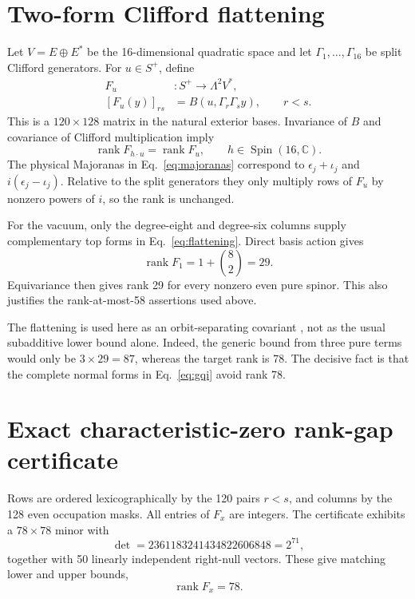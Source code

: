 \documentclass[aps,pra,reprint,groupedaddress,nofootinbib,longbibliography]{revtex4-2}
\newcommand{\C}{\mathbb{C}}
\newcommand{\rank}{\operatorname{rank}}
\begin{document}
\section{Two-form Clifford flattening}
\label{sec:flattening}

Let $V=E\oplus E^*$ be the 16-dimensional quadratic space and let
$\Gamma_1,\ldots,\Gamma_{16}$ be split Clifford generators.  For $u\in S^+$,
define
\begin{align}
 F_u &:S^+\longrightarrow\Lambda^2V^*,\\
 [F_u(y)]_{rs}&=B(u,\Gamma_r\Gamma_s y),\qquad r<s.
 \label{eq:flattening}
\end{align}
This is a $120\times128$ matrix in the natural exterior bases.  Invariance of
$B$ and covariance of Clifford multiplication imply
\begin{equation}
 \rank F_{h\cdot u}=\rank F_u,
 \qquad h\in\operatorname{Spin}(16,\C).
 \label{eq:equivariance}
\end{equation}
The physical Majoranas in Eq.~\eqref{eq:majoranas} correspond to
$\epsilon_j+\iota_j$ and $i(\epsilon_j-\iota_j)$.  Relative to the split
generators they only multiply rows of $F_u$ by nonzero powers of $i$, so the
rank is unchanged.

For the vacuum, only the degree-eight and degree-six columns supply complementary
top forms in Eq.~\eqref{eq:flattening}.  Direct basis action gives
\begin{equation}
 \rank F_1=1+\binom82=29.
 \label{eq:pure-rank}
\end{equation}
Equivariance then gives rank 29 for every nonzero even pure spinor.  This also
justifies the rank-at-most-58 assertions used above.

The flattening is used here as an orbit-separating covariant
\cite{Landsberg2012}, not as the usual
subadditive lower bound alone.  Indeed, the generic bound from three pure terms
would only be $3\times29=87$, whereas the target rank is 78.  The decisive fact
is that the complete normal forms in Eq.~\eqref{eq:gqi} avoid rank 78.

\section{Exact characteristic-zero rank-gap certificate}
\label{sec:certificate}

Rows are ordered lexicographically by the 120 pairs $r<s$, and columns by the
128 even occupation masks.  All entries of $F_x$ are integers.  The certificate
exhibits a $78\times78$ minor with
\begin{equation}
 \det=2361183241434822606848=2^{71},
\end{equation}
together with 50 linearly independent right-null vectors.  These give matching
lower and upper bounds,
\begin{equation}
 \rank F_x=78.
 \label{eq:target-rank}
\end{equation}
\end{document}
